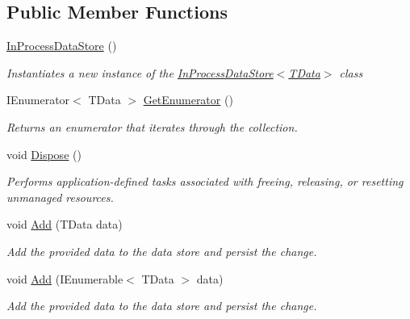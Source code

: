 \subsection*{Public Member Functions}
\begin{DoxyCompactItemize}
\item 
\hyperlink{classCqrs_1_1DataStores_1_1InProcessDataStore_a86a0ef4945e0f2fa45027ceb3261d284_a86a0ef4945e0f2fa45027ceb3261d284}{In\+Process\+Data\+Store} ()
\begin{DoxyCompactList}\small\item\em Instantiates a new instance of the \hyperlink{classCqrs_1_1DataStores_1_1InProcessDataStore_a86a0ef4945e0f2fa45027ceb3261d284_a86a0ef4945e0f2fa45027ceb3261d284}{In\+Process\+Data\+Store$<$\+T\+Data$>$} class \end{DoxyCompactList}\item 
I\+Enumerator$<$ T\+Data $>$ \hyperlink{classCqrs_1_1DataStores_1_1InProcessDataStore_a867c2badec9f0669cf70257f5572b701_a867c2badec9f0669cf70257f5572b701}{Get\+Enumerator} ()
\begin{DoxyCompactList}\small\item\em Returns an enumerator that iterates through the collection. \end{DoxyCompactList}\item 
void \hyperlink{classCqrs_1_1DataStores_1_1InProcessDataStore_a220126a1dd0e318197b9c994c313d5fd_a220126a1dd0e318197b9c994c313d5fd}{Dispose} ()
\begin{DoxyCompactList}\small\item\em Performs application-\/defined tasks associated with freeing, releasing, or resetting unmanaged resources. \end{DoxyCompactList}\item 
void \hyperlink{classCqrs_1_1DataStores_1_1InProcessDataStore_ade5c4033c628598665c0cba986a54c15_ade5c4033c628598665c0cba986a54c15}{Add} (T\+Data data)
\begin{DoxyCompactList}\small\item\em Add the provided {\itshape data}  to the data store and persist the change. \end{DoxyCompactList}\item 
void \hyperlink{classCqrs_1_1DataStores_1_1InProcessDataStore_ad62504e478f0a907c18ec4aa9b42703a_ad62504e478f0a907c18ec4aa9b42703a}{Add} (I\+Enumerable$<$ T\+Data $>$ data)
\begin{DoxyCompactList}\small\item\em Add the provided {\itshape data}  to the data store and persist the change. \end{DoxyCompactList}\item 

\end{DoxyCompactItemize}
